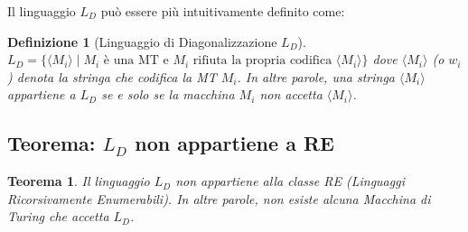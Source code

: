 \documentclass[a4paper]{article}
\newtheorem{theorem}{Teorema}
\newtheorem{definition}{Definizione}
\begin{document}
Il linguaggio $L_D$ può essere più intuitivamente definito come:
\begin{definition}[Linguaggio di Diagonalizzazione $L_D$]
$L_D = \{ \langle M_i \rangle \mid M_i \text{ è una MT e } M_i \text{ rifiuta la propria codifica } \langle M_i \rangle \}$
dove $\langle M_i \rangle$ (o $w_i$) denota la stringa che codifica la MT $M_i$.
In altre parole, una stringa $\langle M_i \rangle$ appartiene a $L_D$ se e solo se la macchina $M_i$ non accetta $\langle M_i \rangle$.
\end{definition}

\subsection{Teorema: $L_D$ non appartiene a RE}

\begin{theorem}
Il linguaggio $L_D$ non appartiene alla classe RE (Linguaggi Ricorsivamente Enumerabili). In altre parole, non esiste alcuna Macchina di Turing che accetta $L_D$.
\end{theorem}
\end{document}
